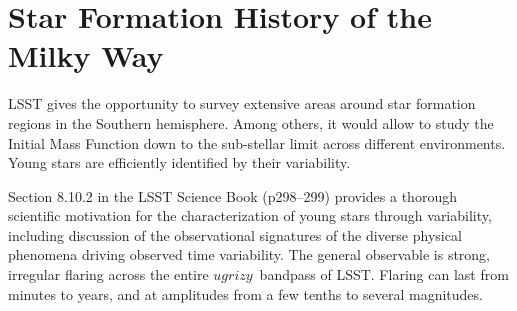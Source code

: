 %
%
%
%
%
%
%

\section{Star Formation History of the Milky Way}
\def\secname{MW_SFH}\label{sec:\secname} %


\label{sec:\secname:targets}


LSST gives the opportunity to survey extensive areas
around star formation regions in the Southern hemisphere. Among
others, it would allow to study the Initial Mass Function down to the
sub-stellar limit across different environments. Young stars are
efficiently identified by their variability.

Section 8.10.2 in the LSST Science Book (p298--299) provides a
  thorough scientific motivation for the characterization of young
  stars through variability, including discussion of the observational
  signatures of the diverse physical phenomena driving observed time
  variability. The general observable is strong, irregular flaring
  across the entire $ugrizy$~bandpass of LSST. Flaring can last from
  minutes to years, and at amplitudes from a few tenths to several
  magnitudes.

